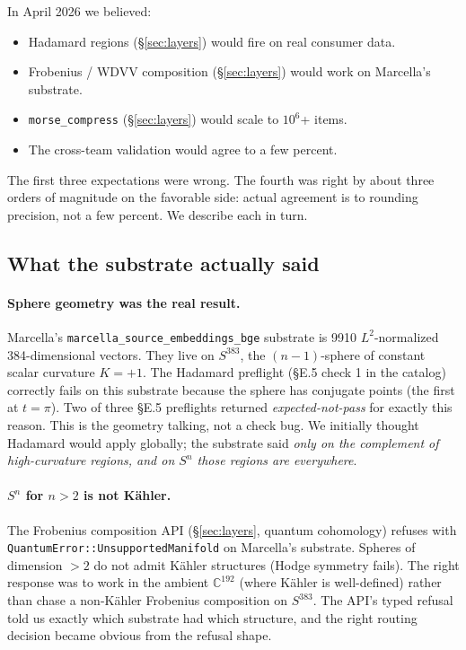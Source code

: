 \documentclass[11pt,letterpaper]{article}
\begin{document}
In April 2026 we believed:

\begin{itemize}[nosep]
\item Hadamard regions (\S\ref{sec:layers}) would fire on real
  consumer data.
\item Frobenius / WDVV composition (\S\ref{sec:layers}) would work on
  Marcella's substrate.
\item \texttt{morse\_compress} (\S\ref{sec:layers}) would scale to
  $10^6$+ items.
\item The cross-team validation would agree to a few percent.
\end{itemize}

The first three expectations were wrong. The fourth was right by
about three orders of magnitude on the favorable side: actual
agreement is to rounding precision, not a few percent. We describe
each in turn.

\subsection{What the substrate actually said}

\paragraph{Sphere geometry was the real result.} Marcella's
\texttt{marcella\_source\_embeddings\_bge} substrate is 9910
$L^2$-normalized 384-dimensional vectors. They live on $S^{383}$, the
$(n-1)$-sphere of constant scalar curvature $K = +1$. The Hadamard
preflight (\S E.5 check 1 in the catalog) correctly fails on this
substrate because the sphere has conjugate points (the first at
$t = \pi$). Two of three \S E.5 preflights returned
\emph{expected-not-pass} for exactly this reason. This is the
geometry talking, not a check bug. We initially thought Hadamard
would apply globally; the substrate said \emph{only on the
complement of high-curvature regions, and on $S^n$ those regions are
everywhere}.

\paragraph{$S^n$ for $n > 2$ is not K\"ahler.} The Frobenius
composition API (\S\ref{sec:layers}, quantum cohomology) refuses with
\texttt{QuantumError::UnsupportedManifold} on Marcella's substrate.
Spheres of dimension $> 2$ do not admit K\"ahler structures (Hodge
symmetry fails). The right response was to work in the ambient
$\mathbb{C}^{192}$ (where K\"ahler is well-defined) rather than chase
a non-K\"ahler Frobenius composition on $S^{383}$. The API's typed
refusal told us exactly which substrate had which structure, and the
right routing decision became obvious from the refusal shape.
\end{document}
